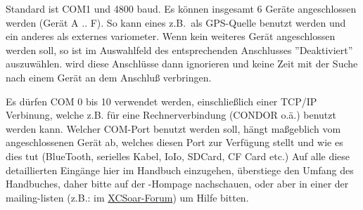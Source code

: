 Standard ist COM1 und 4800 baud. Es können insgesamt 6 Geräte angeschlossen werden (Gerät A .. F).
So kann eines z.B.\ als GPS-Quelle benutzt werden und ein anderes als externes variometer.
Wenn kein weiteres Gerät angeschlossen werden soll, so ist im Auswahlfeld des entsprechenden Anschlusses ''Deaktiviert'' auszuwählen.
\xc wird diese Anschlüsse dann ignorieren und keine Zeit mit der Suche nach einem Gerät an dem Anschluß verbringen.

Es dürfen COM 0 bis 10 verwendet werden,  einschließlich einer TCP/IP Verbinung, welche z.B. für eine
Rechnerverbindung (\textsc{CONDOR} o.ä.) benutzt werden kann. Welcher COM-Port benutzt werden soll, hängt maßgeblich vom angeschlossenen Gerät ab,
welches diesen Port zur Verfügung stellt und wie es dies tut (BlueTooth, serielles Kabel, IoIo, SDCard, CF Card etc.) Auf alle diese detaillierten
Eingänge hier im Handbuch einzugehen, überstiege den Umfang des Handbuches, daher bitte auf der \xc-Hompage nachschauen, oder aber
in einer der mailing-listen  (z.B.:  im \href{https://forum.xcsoar.org}{XCSoar-Forum}) um Hilfe bitten.

